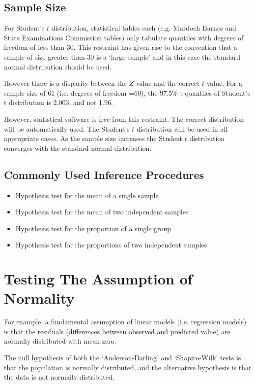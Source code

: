 ﻿

\subsection{Sample Size}
For Student's $t$ distribution, statistical tables such (e.g. Murdoch Barnes and State Examinations Commission tables) only tabulate quantiles with degrees of freedom of less than 30. This restraint has given rise to the convention that a sample of size greater than 30 is a `large sample' and in this case the standard normal distribution should be used.

However there is a disparity between the $Z$ value and the correct $t$ value. For a sample size of 61 (i.e. degrees of freedom =60), the $97.5\%$ t-quantiles of Student's t distribution is 2.003, and not 1.96.

However, statistical software is free from this restraint. The correct distribution will be automatically used. The Student's $t$ distribution will be used in all appropriate cases. As the sample size increases the Student $t$ distribution converges with the standard normal distribution.

\subsection{Commonly Used Inference Procedures}
\begin{itemize}
\item	   Hypothesis test for the mean of a single sample
\item	   Hypothesis test for the mean of two independent samples
\item	   Hypothesis test for the proportion of a single group
\item	   Hypothesis test for the proportions of two independent samples
\end{itemize}

\section{Testing The Assumption of Normality}
For example, a fundamental assumption of linear models (i.e. regression models) is that the residuals (differences between observed and predicted value) are normally distributed with mean zero.


The null hypothesis of both the `Anderson-Darling' and `Shapiro-Wilk' tests is that the population is normally distributed, and the alternative hypothesis is that the data is not normally distributed.

